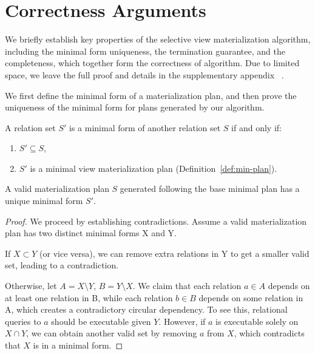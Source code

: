 \section{Correctness Arguments}
\label{sec-proof}

We briefly establish key properties of the selective view materialization algorithm, including the minimal form uniqueness, the termination guarantee, and the completeness, which together form the correctness of \proto algorithm.
Due to limited space, we leave the full proof and details in the supplementary appendix ~\cite{proof}.

\medskip {}
We first define the minimal form of a materialization plan, and then prove the uniqueness of the minimal form for plans generated by our algorithm.

\begin{deff}
A relation set $S'$ is a minimal form of another relation set $S$ if and only if:
\begin{enumerate}
    \item 
    $S' \subseteq S$, 
    \item
    $S'$ is a minimal view materialization plan (Definition~\ref{def:min-plan}).
\end{enumerate}
\end{deff}

\begin{lmm}\label{lemma:uniqness}
    A valid materialization plan $S$ generated following the base minimal plan has a unique minimal form $S'$.
\end{lmm}

\begin{proof}
    We proceed by establishing contradictions. 
    Assume a valid materialization plan has two distinct minimal forms X and Y.

    If $X \subset Y$ (or vice versa), we can remove extra relations in Y to get a smaller valid set, leading to a contradiction.
    
    Otherwise, let $A=X \setminus Y$, $B= Y \setminus X$.
    We claim that each relation $a \in A$ depends on at least one relation in B, while each relation $b \in B$ depends on some relation in A, which creates a contradictory circular dependency.
    To see this, relational queries to $a$ should be executable given $Y$.
    However, if $a$ is executable solely on $X \cap Y$, we can obtain another valid set by removing $a$ from $X$,
    which contradicts that $X$ is in a minimal form.
\end{proof}

